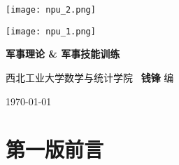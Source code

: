 \documentclass[10pt, UTF8]{ctexbook} %
\begin{document}
\begin{titlepage}
    \thispagestyle{empty}
    \centering
        \vspace*{3cm}
        \texttt{[image: npu\_2.png]}\par
        \vspace{1cm}
        \texttt{[image: npu\_1.png]}\par
    \vspace{1cm}
        \begin{center}
            \Huge \heiti \textbf{军事理论 \& 军事技能训练}
        \end{center}
  
        \vspace{6cm}
        \begin{center}
        \songti
        \kaishu 西北工业大学数学与统计学院 \, \heiti\textbf{钱锋} \quad \songti 编
        \vspace{0.5cm}

    \today
    \end{center}
\end{titlepage}

\newpage
\cleardoublepage




\chapter*{第一版前言}
\thispagestyle{empty}
\end{document}
